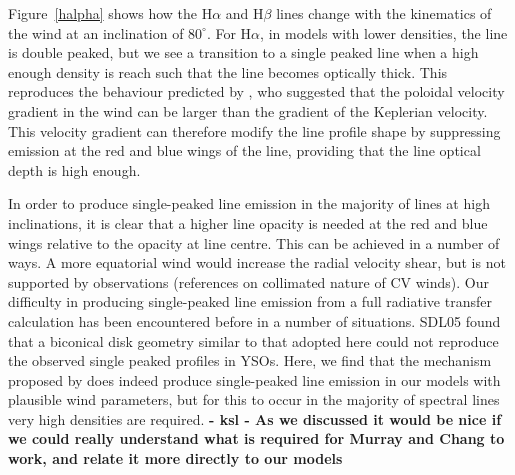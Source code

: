 \documentclass[preprint, a4paper, 11pt]{aastex}
\begin{document}
{%



Figure~\ref{halpha} shows how the H$\alpha$ and H$\beta$ lines change with the kinematics 
of the wind at an inclination of $80^\circ$. For H$\alpha$, in models with lower densities, the
line is double peaked, but we see a transition to a single peaked line when 
a high enough density is reach such that the line becomes optically thick.
This reproduces the behaviour predicted by \cite{MC96}, who suggested that
the poloidal velocity gradient in the wind can be larger than the gradient of 
the Keplerian velocity. This velocity gradient can therefore modify the line profile shape
by suppressing emission at the red and blue wings of the line, 
providing that the line optical depth is high enough.

In order to produce single-peaked line emission in the majority of lines at high inclinations,
it is clear that a higher line opacity is needed at the red and blue wings relative to
the opacity at line centre. This can be achieved in a number of ways. A more equatorial 
wind would increase the radial velocity shear, but is not supported by observations (references 
on collimated nature of CV winds).
Our difficulty in producing single-peaked line emission from a full 
radiative transfer calculation has been encountered before in a number of situations. 
SDL05 found that a biconical disk geometry similar to that adopted here could not reproduce 
the observed single peaked profiles in YSOs. 
Here, we find
that the mechanism proposed by \cite{MC96} does indeed produce 
single-peaked line emission in our models with plausible wind parameters, 
but for this to occur in the majority of
spectral lines very high densities are required.   {\bf - ksl - As we discussed it would be nice if we could really understand what is required for Murray and Chang to work, and relate it more directly to our models}

}
\end{document}

